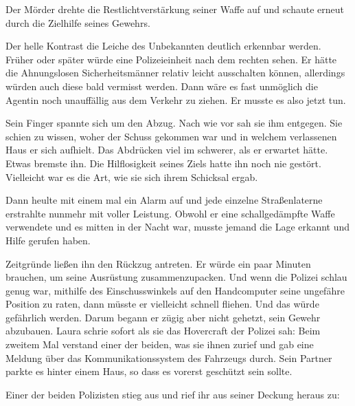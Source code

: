 \par

Der Mörder drehte die Restlichtverstärkung seiner Waffe auf und schaute erneut durch die Zielhilfe seines Gewehrs.

\par

Der helle Kontrast die Leiche des Unbekannten deutlich erkennbar werden. Früher oder später würde eine Polizeieinheit nach dem rechten sehen. Er hätte die Ahnungslosen Sicherheitsmänner relativ leicht ausschalten können, allerdings würden auch diese bald vermisst werden. Dann wäre es fast unmöglich die Agentin noch unauffällig aus dem Verkehr zu ziehen. Er musste es also jetzt tun.

\par

Sein Finger spannte sich um den Abzug. Nach wie vor sah sie ihm entgegen. Sie schien zu wissen, woher der Schuss gekommen war und in welchem verlassenen Haus er sich aufhielt. Das Abdrücken viel im schwerer, als er erwartet hätte. Etwas bremste ihn. Die Hilflosigkeit seines Ziels hatte ihn noch nie gestört. Vielleicht war es die Art, wie sie sich ihrem Schicksal ergab.

\par

Dann heulte mit einem mal ein Alarm auf und jede einzelne Straßenlaterne erstrahlte nunmehr mit voller Leistung. Obwohl er eine schallgedämpfte Waffe verwendete und es mitten in der Nacht war, musste jemand die Lage erkannt und Hilfe gerufen haben.

\par

Zeitgründe ließen ihn den Rückzug antreten. Er würde ein paar Minuten brauchen, um seine Ausrüstung zusammenzupacken. Und wenn die Polizei schlau genug war, mithilfe des Einschusswinkels auf den Handcomputer seine ungefähre Position zu raten, dann müsste er vielleicht schnell fliehen. Und das würde gefährlich werden. Darum begann er zügig aber nicht gehetzt, sein Gewehr abzubauen.
\ortswechsel
Laura schrie sofort als sie das Hovercraft der Polizei sah:  Beim zweitem Mal verstand einer der beiden, was sie ihnen zurief und gab eine Meldung über das Kommunikationssystem des Fahrzeugs durch. Sein Partner parkte es hinter einem Haus, so dass es vorerst geschützt sein sollte.

\par

Einer der beiden Polizisten stieg aus und rief ihr aus seiner Deckung heraus zu: 

